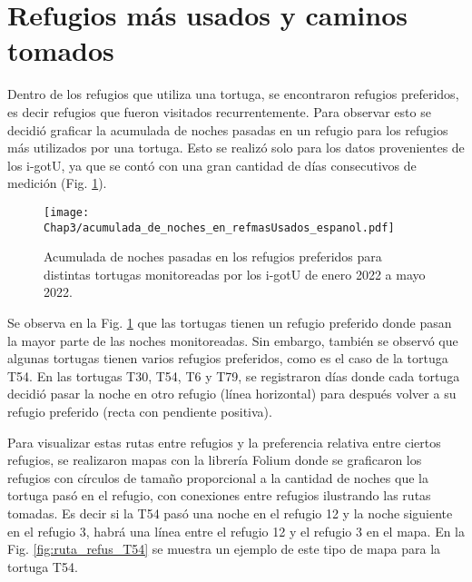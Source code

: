 \section{Refugios más usados y caminos tomados}
Dentro de los refugios que utiliza una tortuga, se encontraron refugios preferidos, es decir refugios que fueron visitados recurrentemente. Para observar esto se decidió graficar la acumulada de noches pasadas en un refugio para los refugios más utilizados por una tortuga. Esto se realizó solo para los datos provenientes de los i-gotU, ya que se contó con una gran cantidad de días consecutivos de medición (Fig. \ref{fig:refugios_preferidos}). 
\begin{figure}[ht]
    \begin{center}
        \texttt{[image: Chap3/acumulada\_de\_noches\_en\_refmasUsados\_espanol.pdf]}
        \caption[Acumulada de noches pasadas en los refugios preferidos.]{Acumulada de noches pasadas en los refugios preferidos para distintas tortugas monitoreadas por los i-gotU de enero 2022 a mayo 2022.}
        \label{fig:refugios_preferidos}
       
        \end{center}
\end{figure}
Se observa en la Fig. \ref{fig:refugios_preferidos} que las tortugas tienen un refugio preferido donde pasan la mayor parte de las noches monitoreadas. Sin embargo, también se observó que algunas tortugas tienen varios refugios preferidos, como es el caso de la tortuga T54. En las tortugas T30, T54, T6 y T79, se registraron días donde cada tortuga decidió pasar la noche en otro refugio (línea horizontal) para después volver a su refugio preferido (recta con pendiente positiva). 

Para visualizar estas rutas entre refugios y la preferencia relativa entre ciertos refugios, se realizaron mapas con la librería Folium donde se graficaron los refugios con círculos de tamaño proporcional a la cantidad de noches que la tortuga pasó en el refugio, con conexiones entre refugios ilustrando las rutas tomadas. Es decir si la T54 pasó una noche en el refugio 12 y la noche siguiente en el refugio 3, habrá una línea entre el refugio 12 y el refugio 3 en el mapa. En la Fig. \ref{fig:ruta_refus_T54} se muestra un ejemplo de este tipo de mapa para la tortuga T54.
 
